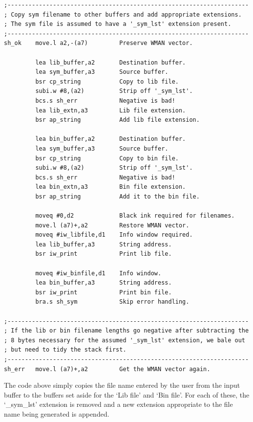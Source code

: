 \begin{lstlisting}[firstnumber=1,]
;---------------------------------------------------------------------
; Copy sym filename to other buffers and add appropriate extensions.
; The sym file is assumed to have a '_sym_lst' extension present.
;---------------------------------------------------------------------
sh_ok    move.l a2,-(a7)         Preserve WMAN vector.

         lea lib_buffer,a2       Destination buffer.
         lea sym_buffer,a3       Source buffer.
         bsr cp_string           Copy to lib file.
         subi.w #8,(a2)          Strip off '_sym_lst'.
         bcs.s sh_err            Negative is bad!
         lea lib_extn,a3         Lib file extension.
         bsr ap_string           Add lib file extension.

         lea bin_buffer,a2       Destination buffer.
         lea sym_buffer,a3       Source buffer.
         bsr cp_string           Copy to bin file.
         subi.w #8,(a2)          Strip off '_sym_lst'.
         bcs.s sh_err            Negative is bad!
         lea bin_extn,a3         Bin file extension.
         bsr ap_string           Add it to the bin file.

         moveq #0,d2             Black ink required for filenames.
         move.l (a7)+,a2         Restore WMAN vector.
         moveq #iw_libfile,d1    Info window required.
         lea lib_buffer,a3       String address.
         bsr iw_print            Print lib file.

         moveq #iw_binfile,d1    Info window.
         lea bin_buffer,a3       String address.
         bsr iw_print            Print bin file.
         bra.s sh_sym            Skip error handling.

;---------------------------------------------------------------------
; If the lib or bin filename lengths go negative after subtracting the
; 8 bytes necessary for the assumed '_sym_lst' extension, we bale out
; but need to tidy the stack first.
;---------------------------------------------------------------------
sh_err   move.l (a7)+,a2         Get the WMAN vector again.

\end{lstlisting}

The code above simply copies the file name entered by the user from
    the input buffer to the buffers set aside for the `Lib file' and `Bin
    file'. For each of these, the `\_sym\_lst' extension is removed and a new
    extension appropriate to the file name being generated is appended.

